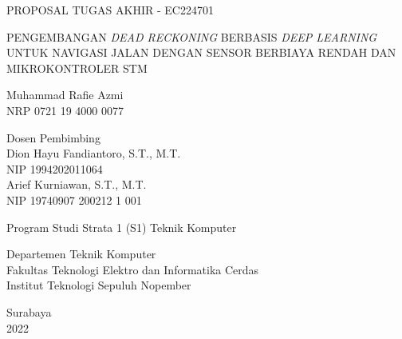 \begin{large}
  PROPOSAL TUGAS AKHIR - EC224701
\end{large}

\vspace{\fill}

\begin{spacing}{1.5}
  \begin{Large}
    PENGEMBANGAN \emph{DEAD RECKONING} BERBASIS \emph{DEEP LEARNING}  
    UNTUK NAVIGASI JALAN DENGAN SENSOR BERBIAYA RENDAH 
    DAN MIKROKONTROLER STM 
  \end{Large}
\end{spacing}

\vspace{\fill}

\begin{large}
  Muhammad Rafie Azmi \\
  \textmd{NRP 0721 19 4000 0077}
\end{large}

\vspace{\fill}

\begin{large}
  \textmd{Dosen Pembimbing} \\
  Dion Hayu Fandiantoro, S.T., M.T. \\
  \textmd{NIP 1994202011064} \\
  Arief Kurniawan, S.T., M.T. \\
  \textmd{NIP 19740907 200212 1 001}
\end{large}

\vspace{\fill}

Program Studi Strata 1 (S1) Teknik Komputer \\

\mdseries

Departemen Teknik Komputer \\
Fakultas Teknologi Elektro dan Informatika Cerdas \\
Institut Teknologi Sepuluh Nopember

Surabaya \\
2022
